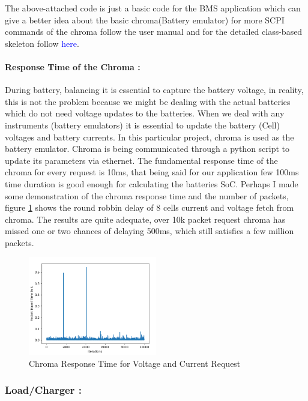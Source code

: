The above-attached code is just a basic code for the BMS application which can give a better idea about the basic chroma(Battery emulator) for more SCPI commands of the chroma follow the user manual\cite{Chroma_UserManual} and for the detailed class-based skeleton follow \textcolor{blue}{here}. %

\paragraph{Response Time of the Chroma :}
During battery, balancing it is essential to capture the battery voltage, in reality, this is not the problem because we might be dealing with the actual batteries which do not need voltage updates to the batteries. When we deal with any instruments (battery emulators) it is essential to update the battery (Cell) voltages and battery currents. In this particular project, chroma is used as the battery emulator. Chroma is being communicated through a python script to update its parameters via ethernet. The fundamental response time of the chroma for every request is 10ms, that being said for our application few 100ms time duration is good enough for calculating the batteries SoC. Perhaps I made some demonstration of the chroma response time and the number of packets, figure \ref{fig:Chroma_Packet_delay} shows the round robbin delay of 8 cells current and voltage fetch from chroma.
The results are quite adequate, over 10k packet request chroma has missed one or two chances of delaying 500ms, which still satisfies a few million packets.

\begin{figure}[h]
	\centering
	\includegraphics[width=0.5\textwidth]{Chap06/Figures/Chroma_Packet_delay.png}
	\caption{Chroma Response Time for Voltage and Current Request }
	\label{fig:Chroma_Packet_delay}
\end{figure}

\subsubsection{Load/Charger :}

